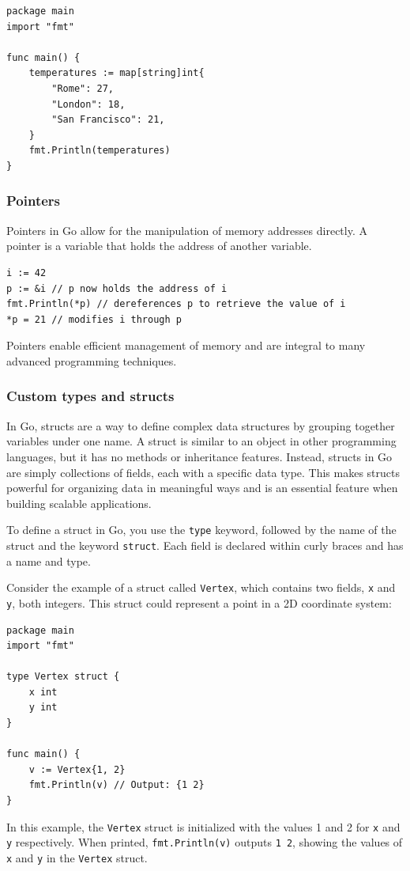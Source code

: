 \begin{verbatim}
package main
import "fmt"

func main() {
    temperatures := map[string]int{
        "Rome": 27,
        "London": 18,
        "San Francisco": 21,
    }
    fmt.Println(temperatures)
}
\end{verbatim}

\subsubsection{Pointers}
Pointers in Go allow for the manipulation of memory addresses directly. A pointer is a variable that holds the address of another variable.

\begin{verbatim}
i := 42
p := &i // p now holds the address of i
fmt.Println(*p) // dereferences p to retrieve the value of i
*p = 21 // modifies i through p
\end{verbatim}
Pointers enable efficient management of memory and are integral to many advanced programming techniques.

\subsubsection{Custom types and structs}
In Go, structs are a way to define complex data structures by grouping together variables under one name. A struct is similar to an object in other programming languages, but it has no methods or inheritance features. Instead, structs in Go are simply collections of fields, each with a specific data type. This makes structs powerful for organizing data in meaningful ways and is an essential feature when building scalable applications.

To define a struct in Go, you use the \texttt{type} keyword, followed by the name of the struct and the keyword \texttt{struct}. Each field is declared within curly braces and has a name and type.

Consider the example of a struct called \texttt{Vertex}, which contains two fields, \texttt{x} and \texttt{y}, both integers. This struct could represent a point in a 2D coordinate system:

\begin{verbatim}
package main
import "fmt"

type Vertex struct {
    x int
    y int
}

func main() {
    v := Vertex{1, 2}
    fmt.Println(v) // Output: {1 2}
}
\end{verbatim}
In this example, the \texttt{Vertex} struct is initialized with the values 1 and 2 for \texttt{x} and \texttt{y} respectively. When printed, \texttt{fmt.Println(v)} outputs \texttt{{1 2}}, showing the values of \texttt{x} and \texttt{y} in the \texttt{Vertex} struct.

